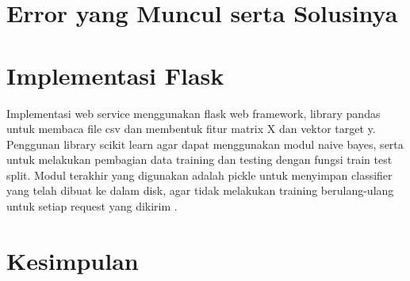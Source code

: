 \documentclass[12pt]{article}
\begin{document}
\section{Error yang Muncul serta Solusinya}



\section{Implementasi Flask}
Implementasi web service menggunakan flask web framework, library pandas untuk membaca file csv dan membentuk fitur matrix X dan vektor target y. Penggunan library scikit learn agar dapat menggunakan modul naive bayes, serta untuk melakukan pembagian data training dan testing dengan fungsi train test split. Modul terakhir yang digunakan adalah pickle untuk menyimpan classifier yang telah dibuat ke dalam disk, agar tidak melakukan training berulang-ulang untuk setiap request yang dikirim \cite{setyawan2017implementasi}.



\section{Kesimpulan}

	
\end{document}
